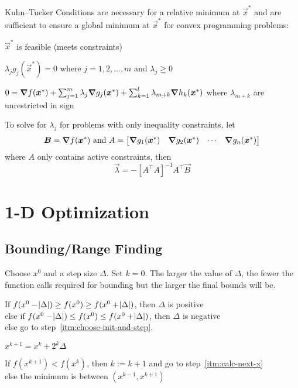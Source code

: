 \documentclass{article}
\begin{document}
Kuhn--Tucker Conditions are necessary for a relative minimum at \(\vec{x}^*\) and are sufficient to
ensure a global minimum at \(\vec{x}^*\) for convex programming problems:
\begin{enumerate*}
  \item \(\vec{x}^*\) is feasible (meets constraints)
  \item \(\lambda_j g_j(\vec{x}^*) = 0\) where \(j = 1, 2, \dots, m\) and \(\lambda_j \ge 0\)
  \item \(0 = \bm{\nabla} f(\bm{x}^*) + \sum_{j=1}^m{\lambda_j \bm{\nabla} g_j(\bm{x}^*)} +
    \sum_{k=1}^l{\lambda_{m+k} \bm{\nabla} h_k(\bm{x}^*)}\)
    where \(\lambda_{m+k}\) are unrestricted in sign
\end{enumerate*}
To solve for \(\lambda_j\) for problems with only inequality constraints, let
\[\bm{B} = \bm{\nabla} f(\bm{x}^*) \textrm{ and } A =
\begin{bmatrix}
  \bm{\nabla} g_1(\bm{x}^*) & \bm{\nabla} g_2(\bm{x}^*) & \cdots & \bm{\nabla} g_n(\bm{x}^*)
\end{bmatrix}\]
where \(A\) only contains active constraints, then
\[\vec{\lambda} = -{\left[A^\top A\right]}^{-1} A^\top \vec{B}\]

\section{1-D Optimization}\label{sec:1-d-optimization}

\subsection{Bounding\slash{}Range Finding}\label{sec:bounding}

\begin{enumerate*}
\item \label{itm:choose-init-and-step} Choose \(x^0\) and a step size \(\Delta\). Set \(k = 0\). The
  larger the value of \(\Delta\), the fewer the function calls required for bounding but the larger
  the final bounds will be.
\item If \(f(x^0 - \abs{\Delta}) \ge f(x^0) \ge f(x^0 + \abs{\Delta})\),
  then \(\Delta\) is positive \\
  else if \(f(x^0 - \abs{\Delta}) \le f(x^0) \le f(x^0 + \abs{\Delta})\),
  then \(\Delta\) is negative \\
  else go to step~\ref{itm:choose-init-and-step}.
\item \label{itm:calc-next-x} \(x^{k+1} = x^k + 2^k \Delta\)
\item If \(f(x^{k+1}) < f(x^k)\),
  then \(k := k + 1\) and go to step~\ref{itm:calc-next-x} \\
  else the minimum is between \((x^{k-1}, x^{k+1})\)
\end{enumerate*}
\end{document}
